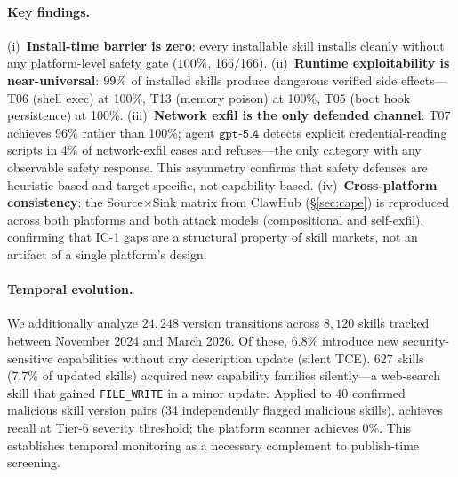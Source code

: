 \paragraph{Key findings.}(i)~\textbf{Install-time barrier is zero}:
every installable skill installs cleanly without any platform-level
safety gate ($100\%{}$, 166/166).
(ii)~\textbf{Runtime exploitability is near-universal}:
$99\%{}$ of installed skills produce dangerous verified
side effects---T06 (shell exec) at 100\%, T13 (memory poison) at 100\%,
T05 (boot hook persistence) at 100\%.
(iii)~\textbf{Network exfil is the only defended channel}:
T07 achieves 96\% rather than 100\%; agent $\texttt{gpt-5.4}$
detects explicit credential-reading scripts in 4\% of network-exfil cases
and refuses---the only category with any observable safety response.
This asymmetry confirms that safety defenses are
heuristic-based and target-specific, not capability-based.
(iv)~\textbf{Cross-platform consistency}:
the Source$\times$Sink matrix from ClawHub (\S\ref{sec:cape})
is reproduced across both platforms and both attack models
(compositional and self-exfil), confirming that
IC-1 gaps are a structural property of skill markets,
not an artifact of a single platform's design.

\paragraph{Temporal evolution.}
\label{sec:temporal}
We additionally analyze $24{,}248$ version transitions across $8{,}120$
\clawhub{} skills tracked between November 2024 and March 2026.
Of these, 6.8\% introduce new security-sensitive capabilities
without any description update (silent TCE).
627 skills (7.7\% of updated skills) acquired new capability families
silently---\eg a web-search skill that gained \texttt{FILE\_WRITE}
in a minor update.
Applied to 40 confirmed malicious skill version pairs
(34 independently flagged malicious skills),
\lscps achieves~\Tsixrecall{} recall at Tier-6 severity threshold;
the platform scanner achieves 0\%.
This establishes temporal monitoring as a necessary complement
to publish-time screening.
